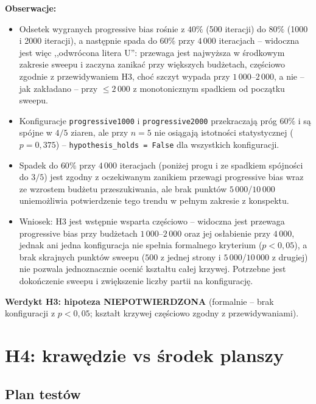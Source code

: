 \documentclass[11pt,a4paper]{article}
\begin{document}
\textbf{Obserwacje:}
\begin{itemize}
    \item Odsetek wygranych progressive bias rośnie z $40\%$ (500
        iteracji) do $80\%$ (1000 i 2000 iteracji), a następnie spada do
        $60\%$ przy $4\,000$ iteracjach -- widoczna jest więc
        ,,odwrócona litera U'': przewaga jest najwyższa w środkowym
        zakresie sweepu i zaczyna zanikać przy większych budżetach,
        częściowo zgodnie z przewidywaniem H3, choć szczyt wypada przy
        $1\,000$--$2\,000$, a nie -- jak zakładano -- przy $\leq 2\,000$
        z monotonicznym spadkiem od początku sweepu.
    \item Konfiguracje \texttt{progressive1000} i \texttt{progressive2000}
        przekraczają próg $60\%$ i są spójne w $4/5$ ziaren, ale przy
        $n=5$ nie osiągają istotności statystycznej
        ($p=0{,}375$) -- \texttt{hypothesis\_holds = False} dla
        wszystkich konfiguracji.
    \item Spadek do $60\%$ przy $4\,000$ iteracjach (poniżej progu i ze
        spadkiem spójności do $3/5$) jest zgodny z oczekiwanym zanikiem
        przewagi progressive bias wraz ze wzrostem budżetu
        przeszukiwania, ale brak punktów $5\,000$/$10\,000$ uniemożliwia
        potwierdzenie tego trendu w pełnym zakresie z konspektu.
    \item Wniosek: H3 jest wstępnie wsparta częściowo -- widoczna
        jest przewaga progressive bias przy budżetach
        $1\,000$--$2\,000$ oraz jej osłabienie przy $4\,000$, jednak ani
        jedna konfiguracja nie spełnia formalnego kryterium ($p<0{,}05$),
        a brak skrajnych punktów sweepu ($500$ z jednej strony i
        $5\,000$/$10\,000$ z drugiej) nie pozwala jednoznacznie ocenić
        kształtu całej krzywej. Potrzebne jest dokończenie sweepu i
        zwiększenie liczby partii na konfigurację.
\end{itemize}

\medskip
\noindent\textbf{Werdykt H3: hipoteza NIEPOTWIERDZONA} (formalnie --
brak konfiguracji z $p<0{,}05$; kształt krzywej częściowo zgodny z
przewidywaniami).


\section{H4: krawędzie vs środek planszy}
\label{sec:h4}

\subsection{Plan testów}
\end{document}
